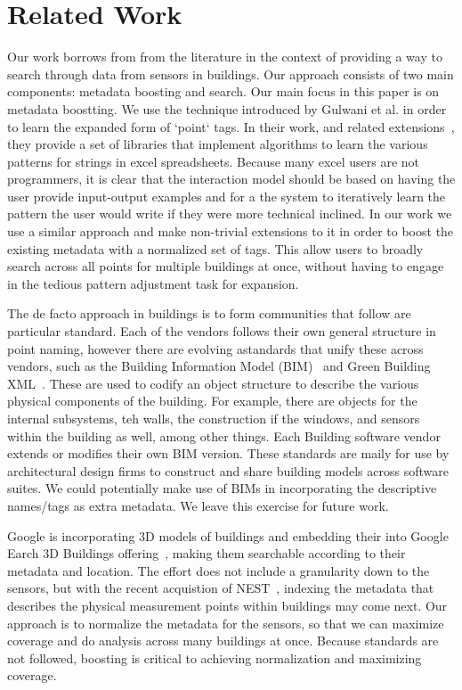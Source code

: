 \section{Related Work}

Our work borrows from from the literature in the context of providing a way to search
through data from sensors in buildings.  Our approach consists of two main components:
metadata boosting and search.  Our main focus in this paper is on metadata boostting.
We use the technique introduced by Gulwani et al.\cite{Gulwani:2011} in order to learn 
the expanded form of `point` tags.  In their work, and related extensions~\cite{Harris:2011,
Singh:2012,Gulwani12spreadsheetdata}, they provide a set of libraries that implement
algorithms to learn the various patterns for strings in excel spreadsheets.  Because many
excel users are not programmers, it is clear that the interaction model should be based
on having the user provide input-output examples and for a the system to iteratively learn
the pattern the user would write if they were more technical inclined.  In our work
we use a similar approach  and make non-trivial extensions to it in order to boost the
existing metadata with a normalized set of tags.  This allow users to broadly search across
all points for multiple buildings at once, without having to engage in the tedious
pattern adjustment task for expansion.

The de facto approach in buildings is to form communities that follow are particular standard.
Each of the vendors follows their own general structure in point naming, however there
are evolving astandards that unify these across vendors, such as the Building
Information Model (BIM)~\cite{BIM} and Green Building XML~\cite{GBXML}.  These are used to
codify an object structure to describe the various physical components of the building.
For example, there are objects for the internal subsystems, teh walls, the construction
if the windows, and sensors within the building as well, among other things.  Each
Building software vendor extends or modifies their own BIM version.
These standards are maily 
for use by architectural design firms to construct and share building models across software
suites. We could potentially make use of BIMs in incorporating the descriptive names/tags
as extra metadata.  We leave this exercise for future work.

Google is incorporating 3D models of buildings and embedding their into Google 
Earch 3D Buildings offering~\cite{google_3dbuildings}, making them searchable according 
to their metadata and location.
The effort does not include a granularity down to the sensors, but with the recent acquistion
of NEST~\cite{nest}, indexing the metadata that describes the physical measurement points
within buildings may come next.  Our approach is to normalize the metadata for the sensors,
so that we can maximize coverage and do analysis across many buildings at once.  Because standards
are not followed, boosting is critical to achieving normalization and maximizing coverage.

